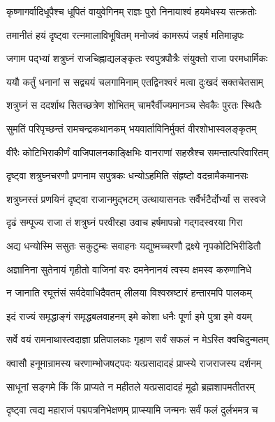 \twolineshloka
{कृष्णागर्वादिधूपैश्च धूपितं वायुवेगिनम्}
{राज्ञः पुरो निनायाश्वं हयमेधस्य सत्क्रतोः}%

\twolineshloka
{तमानीतं हयं दृष्ट्वा रत्नमालाविभूषितम्}
{मनोजवं कामरूपं जहर्ष मतिमान्नृपः}%

\twolineshloka
{जगाम पद्भ्यां शत्रुघ्नं राजचिह्नाद्यलङ्कृतः}
{स्वपुत्रपौत्रैः संयुक्तो राजा परमधार्मिकः}%

\twolineshloka
{ययौ कर्तुं धनानां स सद्व्ययं चलगामिनाम्}
{एतद्विनश्वरं मत्वा दुःखदं सक्तचेतसाम्}%

\twolineshloka
{शत्रुघ्नं स ददर्शाथ सितच्छत्रेण शोभितम्}
{चामरैर्वीज्यमानञ्च सेवकैः पुरतः स्थितैः}%

\twolineshloka
{सुमतिं परिपृच्छन्तं रामचन्द्रकथानकम्}
{भयवार्ताविनिर्मुक्तं वीरशोभास्वलङ्कृतम्}%

\twolineshloka
{वीरैः कोटिभिराकीर्णं वाजिपालनकाङ्क्षिभिः}
{वानराणां सहस्रैश्च समन्तात्परिवारितम्}%

\twolineshloka
{दृष्ट्वा शत्रुघ्नचरणौ प्रणनाम सपुत्रकः}
{धन्योऽहमिति संहृष्टो वदन्रामैकमानसः}%

\twolineshloka
{शत्रुघ्नस्तं प्रणयिनं दृष्ट्वा राजानमुद्भटम्}
{उत्थायासनतः सर्वैर्भटैर्दोर्भ्यां स सस्वजे}%

\twolineshloka
{दृढं सम्पूज्य राजा तं शत्रुघ्नं परवीरहा}
{उवाच हर्षमापन्नो गद्गदस्वरया गिरा}%


\twolineshloka
{अद्य धन्योस्मि ससुतः सकुटुम्बः सवाहनः}
{यद्युष्मच्चरणौ द्रक्ष्ये नृपकोटिभिरीडितौ}%

\twolineshloka
{अज्ञानिना सुतेनायं गृहीतो वाजिनां वरः}
{दमनेनानयं त्वस्य क्षमस्व करुणानिधे}%

\twolineshloka
{न जानाति रघूत्तंसं सर्वदेवाधिदैवतम्}
{लीलया विश्वस्रष्टारं हन्तारमपि पालकम्}%

\twolineshloka
{इदं राज्यं समृद्धाङ्गं समृद्धबलवाहनम्}
{इमे कोशा धनैः पूर्णा इमे पुत्रा इमे वयम्}%

\twolineshloka
{सर्वे वयं रामनाथास्त्वदाज्ञा प्रतिपालकाः}
{गृहाण सर्वं सफलं न मेऽस्ति क्वचिदुन्मतम्}%

\twolineshloka
{क्वासौ हनूमान्रामस्य चरणाम्भोजषट्पदः}
{यत्प्रसादादहं प्राप्स्ये राजराजस्य दर्शनम्}%

\twolineshloka
{साधूनां सङ्गमे किं किं प्राप्यते न महीतले}
{यत्प्रसादादहं मूढो ब्रह्मशापमतीतरम्}%

\twolineshloka
{दृष्ट्वा त्वद्य महाराजं पद्मपत्रनिभेक्षणम्}
{प्राप्स्यामि जन्मनः सर्वं फलं दुर्लभमत्र च}%

